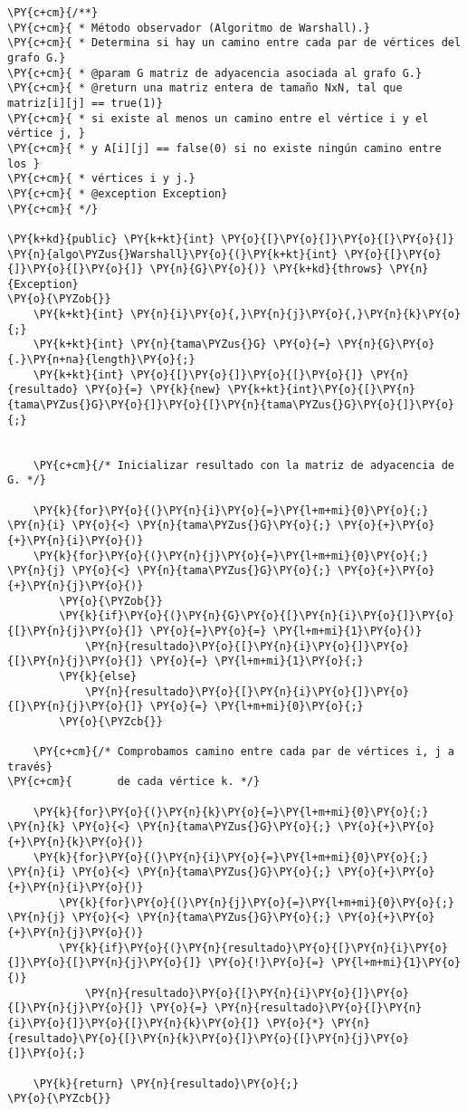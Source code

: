 \begin{Verbatim}[commandchars=\\\{\}]
\PY{c+cm}{/**}
\PY{c+cm}{ * Método observador (Algoritmo de Warshall).}
\PY{c+cm}{ * Determina si hay un camino entre cada par de vértices del grafo G.}
\PY{c+cm}{ * @param G matriz de adyacencia asociada al grafo G.}
\PY{c+cm}{ * @return una matriz entera de tamaño NxN, tal que matriz[i][j] == true(1)}
\PY{c+cm}{ * si existe al menos un camino entre el vértice i y el vértice j, }
\PY{c+cm}{ * y A[i][j] == false(0) si no existe ningún camino entre los }
\PY{c+cm}{ * vértices i y j.}
\PY{c+cm}{ * @exception Exception}
\PY{c+cm}{ */}

\PY{k+kd}{public} \PY{k+kt}{int} \PY{o}{[}\PY{o}{]}\PY{o}{[}\PY{o}{]} \PY{n}{algo\PYZus{}Warshall}\PY{o}{(}\PY{k+kt}{int} \PY{o}{[}\PY{o}{]}\PY{o}{[}\PY{o}{]} \PY{n}{G}\PY{o}{)} \PY{k+kd}{throws} \PY{n}{Exception}
\PY{o}{\PYZob{}}
    \PY{k+kt}{int} \PY{n}{i}\PY{o}{,}\PY{n}{j}\PY{o}{,}\PY{n}{k}\PY{o}{;}
    \PY{k+kt}{int} \PY{n}{tama\PYZus{}G} \PY{o}{=} \PY{n}{G}\PY{o}{.}\PY{n+na}{length}\PY{o}{;}
    \PY{k+kt}{int} \PY{o}{[}\PY{o}{]}\PY{o}{[}\PY{o}{]} \PY{n}{resultado} \PY{o}{=} \PY{k}{new} \PY{k+kt}{int}\PY{o}{[}\PY{n}{tama\PYZus{}G}\PY{o}{]}\PY{o}{[}\PY{n}{tama\PYZus{}G}\PY{o}{]}\PY{o}{;}


    \PY{c+cm}{/* Inicializar resultado con la matriz de adyacencia de G. */}

    \PY{k}{for}\PY{o}{(}\PY{n}{i}\PY{o}{=}\PY{l+m+mi}{0}\PY{o}{;} \PY{n}{i} \PY{o}{<} \PY{n}{tama\PYZus{}G}\PY{o}{;} \PY{o}{+}\PY{o}{+}\PY{n}{i}\PY{o}{)}
	\PY{k}{for}\PY{o}{(}\PY{n}{j}\PY{o}{=}\PY{l+m+mi}{0}\PY{o}{;} \PY{n}{j} \PY{o}{<} \PY{n}{tama\PYZus{}G}\PY{o}{;} \PY{o}{+}\PY{o}{+}\PY{n}{j}\PY{o}{)}
	    \PY{o}{\PYZob{}}
		\PY{k}{if}\PY{o}{(}\PY{n}{G}\PY{o}{[}\PY{n}{i}\PY{o}{]}\PY{o}{[}\PY{n}{j}\PY{o}{]} \PY{o}{=}\PY{o}{=} \PY{l+m+mi}{1}\PY{o}{)}
		    \PY{n}{resultado}\PY{o}{[}\PY{n}{i}\PY{o}{]}\PY{o}{[}\PY{n}{j}\PY{o}{]} \PY{o}{=} \PY{l+m+mi}{1}\PY{o}{;}
		\PY{k}{else}
		    \PY{n}{resultado}\PY{o}{[}\PY{n}{i}\PY{o}{]}\PY{o}{[}\PY{n}{j}\PY{o}{]} \PY{o}{=} \PY{l+m+mi}{0}\PY{o}{;}
	    \PY{o}{\PYZcb{}}

    \PY{c+cm}{/* Comprobamos camino entre cada par de vértices i, j a través}
\PY{c+cm}{       de cada vértice k. */}

    \PY{k}{for}\PY{o}{(}\PY{n}{k}\PY{o}{=}\PY{l+m+mi}{0}\PY{o}{;} \PY{n}{k} \PY{o}{<} \PY{n}{tama\PYZus{}G}\PY{o}{;} \PY{o}{+}\PY{o}{+}\PY{n}{k}\PY{o}{)}
	\PY{k}{for}\PY{o}{(}\PY{n}{i}\PY{o}{=}\PY{l+m+mi}{0}\PY{o}{;} \PY{n}{i} \PY{o}{<} \PY{n}{tama\PYZus{}G}\PY{o}{;} \PY{o}{+}\PY{o}{+}\PY{n}{i}\PY{o}{)}
	    \PY{k}{for}\PY{o}{(}\PY{n}{j}\PY{o}{=}\PY{l+m+mi}{0}\PY{o}{;} \PY{n}{j} \PY{o}{<} \PY{n}{tama\PYZus{}G}\PY{o}{;} \PY{o}{+}\PY{o}{+}\PY{n}{j}\PY{o}{)}
		\PY{k}{if}\PY{o}{(}\PY{n}{resultado}\PY{o}{[}\PY{n}{i}\PY{o}{]}\PY{o}{[}\PY{n}{j}\PY{o}{]} \PY{o}{!}\PY{o}{=} \PY{l+m+mi}{1}\PY{o}{)}
		    \PY{n}{resultado}\PY{o}{[}\PY{n}{i}\PY{o}{]}\PY{o}{[}\PY{n}{j}\PY{o}{]} \PY{o}{=} \PY{n}{resultado}\PY{o}{[}\PY{n}{i}\PY{o}{]}\PY{o}{[}\PY{n}{k}\PY{o}{]} \PY{o}{*} \PY{n}{resultado}\PY{o}{[}\PY{n}{k}\PY{o}{]}\PY{o}{[}\PY{n}{j}\PY{o}{]}\PY{o}{;}

    \PY{k}{return} \PY{n}{resultado}\PY{o}{;}
\PY{o}{\PYZcb{}}
\end{Verbatim}
